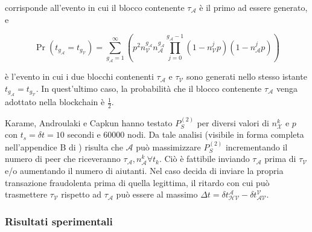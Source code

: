 corrisponde all'evento in cui il blocco contenente $\tau_\mathcal{A}$ è il primo ad essere generato, e

\[ \Pr \left( t_{g_\mathcal{A}} = t_{g_\mathcal{V}} \right) = \sum^{\infty}_{g_\mathcal{A}=1} \left( p^2 n^{g_\mathcal{A}}_\mathcal{V} n^{g_\mathcal{A}}_\mathcal{A} \prod^{g_\mathcal{A} - 1}_{j=0} \left( 1 - n^j_\mathcal{V} p \right)\left( 1 - n^j_\mathcal{A} p \right) \right) \]

è l'evento in cui i due blocchi contenenti $\tau_\mathcal{A}$ e $\tau_\mathcal{V}$ sono generati nello stesso istante $t_{g_\mathcal{A}} = t_{g_\mathcal{V}}$. In quest'ultimo caso, la probabilità che il blocco contenente $\tau_\mathcal{A}$ venga adottato nella blockchain è $\frac{1}{2}$.

Karame, Androulaki e Capkun hanno testato $P^{\left(2\right)}_S$ per diversi valori di $n^k_\mathcal{X}$ e $p$ con $t_s = \delta t = 10$ secondi e 60000 nodi. Da tale analisi (visibile in forma completa nell'appendice B di \cite{doublespendig_fast}) risulta che $\mathcal{A}$ può massimizzare $P^{\left(2\right)}_S$ incrementando il numero di peer che riceveranno $\tau_\mathcal{A}, n^k_\mathcal{A} \forall t_k$. Ciò è fattibile inviando $\tau_\mathcal{A}$ prima di $\tau_\mathcal{V}$ e/o aumentando il numero di aiutanti. Nel caso decida di inviare la propria transazione fraudolenta prima di quella legittima, il ritardo con cui può trasmettere $\tau_\mathcal{V}$ rispetto ad $\tau_\mathcal{A}$ può essere al massimo $\Delta t = \delta t^\mathcal{A}_\mathcal{HV} - \delta t^\mathcal{V}_\mathcal{AV}$.

\subsubsection{Risultati sperimentali}

